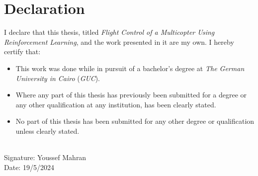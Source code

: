 \chapter*{Declaration}
    I declare that this thesis, titled \textit{Flight Control of a Multicopter Using Reinforcement Learning}, and the work presented in it are my own. I hereby certify that:
    \begin{itemize}
        \item This work was done while in pursuit of a bachelor's degree at \textit{The German University in Cairo} (\textit{GUC}).
        \item Where any part of this thesis has previously been submitted for a degree or any other qualification at any institution, has been clearly stated.
        \item No part of this thesis has been submitted for any other degree or qualification unless clearly stated.
    \end{itemize}
    
    \vspace{1.5cm}
    \begin{flushright}
        \underline{\hspace{8cm}}\\
        \vspace{0.8cm}
        Signature: Youssef Mahran \\
        Date: 19/5/2024
    \end{flushright}
\clearpage